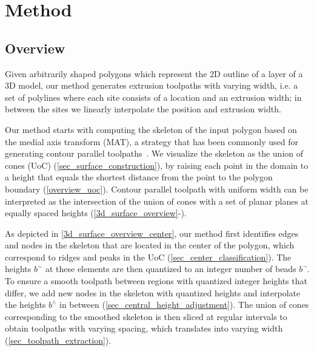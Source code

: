 \section{Method}
\subsection{Overview}

Given arbitrarily shaped polygons which represent the 2D outline of a layer of a 3D model, our method generates extrusion toolpaths with varying width, i.e. a set of polylines where each site consists of a location and an extrusion width;
in between the sites we linearly interpolate the position and extrusion width.

Our method starts with computing the skeleton of the input polygon based on the medial axis transform (MAT), a strategy that has been commonly used for generating contour parallel toolpaths~\cite{eiamsa2003toward}. 
We visualize the skeleton as the union of cones (UoC) (\cref{sec_surface_construction}), by raising each point in the domain to a height that equals the shortest distance from the point to the polygon boundary (\cref{overview_uoc}).
Contour parallel toolpath with uniform width can be interpreted as the intersection of the union of cones with a set of planar planes at equally spaced heights (\cref{3d_surface_overview}-).

As depicted in \cref{3d_surface_overview_center}, our method first identifies edges and nodes in the skeleton that are located in the center of the polygon, which correspond to ridges and peaks in the UoC  (\cref{sec_center_classification}).
The heights $b^\sim$ at these elements are then quantized to an integer number of beads $b^\neg$.
To ensure a smooth toolpath between regions with quantized integer heights that differ, we add new nodes in the skeleton with quantized heights and interpolate the heights $b^\wedge$ in between (\cref{sec_central_height_adjustment}).
The union of cones corresponding to the smoothed skeleton is then sliced at regular intervals to obtain toolpaths with varying spacing, which translates into varying width (\cref{sec_toolpath_extraction}).


